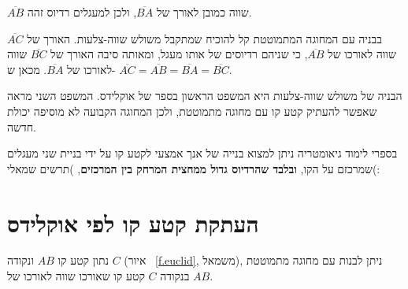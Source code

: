 $\overline{AB}$
שווה כמובן לאורך של
$\overline{BA}$,
ולכן למעגלים רדיוס זהה.

בבניה עם המחוגה המתמוטטת קל להוכיח שמתקבל משולש שווה-צלעות. האורך של
$\overline{AC}$
שווה לאורכו של
$\overline{AB}$,
כי שניהם רדיוסים של אותו מעגל, ומאותה סיבה האורך של
$\overline{BC}$
שווה לאורכו של
$\overline{BA}$.
מכאן ש-%
$\overline{AC} = \overline{AB} = \overline{BA} = \overline{BC}$.

הבניה של משולש שווה-צלעות היא המשפט הראשון בספר של אוקלידס. המשפט השני מראה שאפשר להעתיק קטע קו עם מחוגה מתמוטטת, ולכן המחוגה הקבועה לא מוסיפה יכולת חדשה. 

בספרי לימוד גיאומטריה ניתן למצוא בנייה של אנך אמצעי לקטע קו על ידי בניית שני מעגלים שמרכזם על הקו, 
\textbf{ובלבד שהרדיוס גדול ממחצית המרחק בין המרכזים},
)תרשים שמאלי(:



\section{העתקת קטע קו לפי אוקלידס}\label{s.collapse-copy}

\begin{theorem}
נתון קטע קו
$AB$
ונקודה
$C$
(איור%
~\ref{f.euclid},
משמאל), ניתן לבנות עם מחוגה מתמוטטת בנקודה
$C$
קטע קו שאורכו שווה לאורכו של 
$AB$.
\end{theorem}


